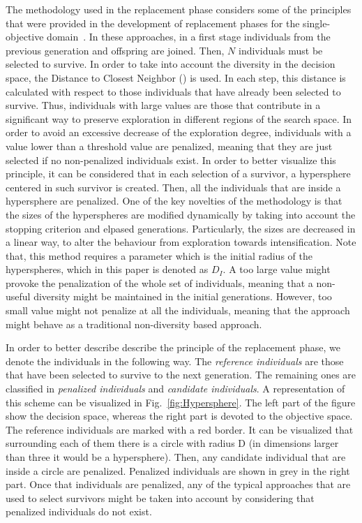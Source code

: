 The methodology used in the replacement phase considers some of the principles that were provided in the 
development of replacement phases for the single-objective domain~\cite{Joel:MULTI_DYNAMIC}.
%
In these approaches, in a first stage individuals from the previous generation and offspring are joined.
%
Then, $N$ individuals must be selected to survive.
%
In order to take into account the diversity in the decision space, the 
Distance to Closest Neighbor (\DCN{}) is used.
%
In each step, this distance is calculated with respect to those individuals that have already been selected to survive.
%
Thus, individuals with large \DCN{} values are those that contribute in a significant way to preserve exploration in different regions of the search space.
%
In order to avoid an excessive decrease of the exploration degree, individuals with a \DCN{} value lower than a threshold value are penalized, meaning that
they are just selected if no non-penalized individuals exist.
%
In order to better visualize this principle, it can be considered that in each selection of a survivor, a hypersphere centered in such survivor is created.
%
Then, all the individuals that are inside a hypersphere are penalized.
%
One of the key novelties of the methodology is that the sizes of the hyperspheres are modified dynamically by taking into account the stopping criterion
and elpased generations.
%
Particularly, the sizes are decreased in a linear way, to alter the behaviour from exploration towards intensification.
%
Note that, this method requires a parameter which is the initial radius of the hyperspheres, which in this paper is denoted as $D_I$. 
%
A too large value might provoke the penalization of the whole set of individuals, meaning that a non-useful diversity might be maintained in the initial generations.
%
However, too small value might not penalize at all the individuals, meaning that the approach might behave as a traditional non-diversity based approach.

In order to better describe describe the principle of the replacement phase, we denote the individuals in the following way.
%
The \textit{reference individuals} are those that have been selected to survive to the next generation. 
%
The remaining ones are classified in \textit{penalized individuals} and \textit{candidate individuals}.
%
A representation of this scheme can be visualized in Fig.~\ref{fig:Hypersphere}.
%
The left part of the figure show the decision space, whereas the right part is devoted to the objective space. 
%
The reference individuals are marked with a red border.
%
It can be visualized that surrounding each of them there is a circle with radius D (in dimensions larger than three it would be a hypersphere).
%
Then, any candidate individual that are inside a circle are penalized.
%
Penalized individuals are shown in grey in the right part.
%
Once that individuals are penalized, any of the typical approaches that are used to select survivors might be taken into account
by considering that penalized individuals do not exist.


